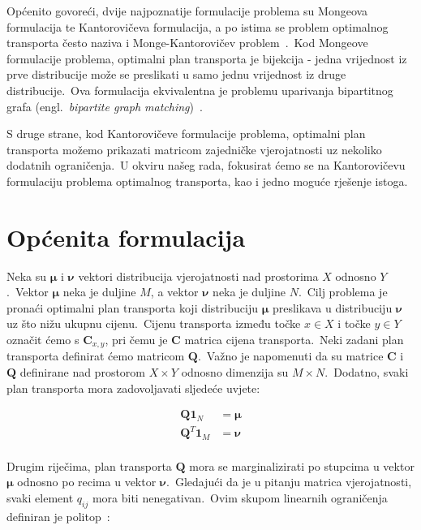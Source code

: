 \documentclass[diplomskirad]{fer}
\begin{document}
Općenito govoreći, dvije najpoznatije formulacije problema su Mongeova formulacija te Kantorovičeva formulacija, a po istima se problem optimalnog transporta često naziva i Monge-Kantorovičev problem~\cite{bogachev2012monge}.\ 
Kod Mongeove formulacije problema, optimalni plan transporta je bijekcija - jedna vrijednost iz prve distribucije može se preslikati u samo jednu vrijednost iz druge distribucije.\ 
Ova formulacija ekvivalentna je problemu uparivanja bipartitnog grafa (engl.\ \textit{bipartite graph matching})~\cite{karp1990optimal}.\ 
  
S druge strane, kod Kantorovičeve formulacije problema, optimalni plan transporta možemo prikazati matricom zajedničke vjerojatnosti uz nekoliko dodatnih ograničenja.\ 
U okviru našeg rada, fokusirat ćemo se na Kantorovičevu formulaciju problema optimalnog transporta, kao i jedno moguće rješenje istoga.\

\section{Općenita formulacija}
\label{sek:opcenito_transport}

Neka su $\bm{\mu}$ i $\bm{\nu}$ vektori distribucija vjerojatnosti nad prostorima $X$ odnosno $Y$.\ Vektor $\bm{\mu}$ neka je duljine $M$, a vektor $\bm{\nu}$ neka je duljine $N$.\
Cilj problema je pronaći optimalni plan transporta koji distribuciju $\bm{\mu}$ preslikava u distribuciju $\bm{\nu}$ uz što nižu ukupnu cijenu.\ 
Cijenu transporta između točke $x \in X$ i točke $y \in Y$ označit ćemo s $\bm{C}_{x,y}$, pri čemu je $\bm{C}$ matrica cijena transporta.\ 
Neki zadani plan transporta definirat ćemo matricom $\bm{Q}$.\ Važno je napomenuti da su matrice $\bm{C}$ i $\bm{Q}$ definirane nad prostorom $X \times Y$ odnosno dimenzija su $M \times N$.\ 
Dodatno, svaki plan transporta mora zadovoljavati sljedeće uvjete:

\begin{equation}
  \begin{aligned}
    \bm{Q} \bm{1}_N &= \bm{\mu} \\
    \bm{Q}^T \bm{1}_M &= \bm{\nu} \\
  \end{aligned}
  \label{eq:ot_plan_conds}
\end{equation}

Drugim riječima, plan transporta $\bm{Q}$ mora se marginalizirati po stupcima u vektor $\bm{\mu}$ odnosno po recima u vektor $\bm{\nu}$.\ Gledajući da je u pitanju matrica vjerojatnosti, svaki element $q_{ij}$ mora biti nenegativan.\ 
Ovim skupom linearnih ograničenja definiran je politop~\cite{ziegler1993lectures}:
\end{document}
